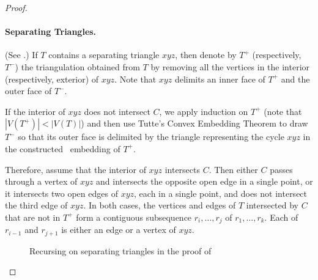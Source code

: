 \begin{proof}
	
	
	\paragraph{Separating Triangles.}
	(See .)
	If $T$ contains a separating triangle $xyz$, then denote by $T^+$ (respectively, $T^-$) the triangulation obtained from $T$ by removing all the vertices in the interior (respectively, exterior) of $xyz$. Note that $xyz$ delimits an inner face of $T^+$ and the outer face of $T^-$. 
	
	If the interior of $xyz$ does not intersect $C$, we apply induction on $T^+$ (note that $|V(T^+)|<|V(T)|$) and then use Tutte's Convex Embedding Theorem  \cite{tutte:how} to draw $T^-$ so that its outer face is delimited by the triangle representing the cycle $xyz$ in the constructed \Fary\ embedding of $T^+$.
	
	Therefore, assume that the interior of $xyz$ intersects $C$. Then either $C$ passes through a vertex of $xyz$ and intersects the opposite open edge in a single point, or it intersects two open edges of $xyz$, each in a single point, and does not intersect the third edge of $xyz$. 
	In both cases, the vertices and edges of $T$ intersected by $C$ that are not in $T^+$ form a contiguous
	subsequence $r_i,\ldots,r_j$ of $r_1,\ldots,r_k$. Each of $r_{i-1}$ and $r_{j+1}$ is either an edge or a vertex of $xyz$.  
	
	\begin{figure}
		\caption{Recursing on separating triangles in the proof of
			}
	\end{figure}
	

\end{proof}
